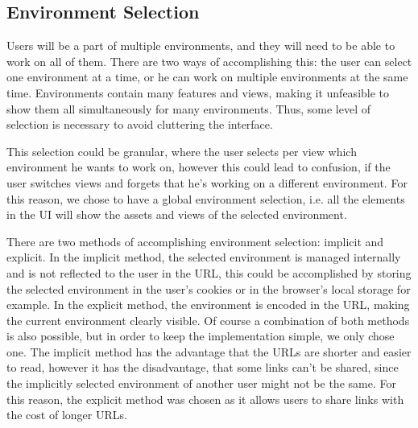 


\subsection{Environment Selection}

Users will be a part of multiple environments, and they will need to be able to work on
all of them.
There are two ways of accomplishing this: the user can select one environment at a time,
or he can work on multiple environments at the same time.
%
%
Environments contain many features and views, making it unfeasible to show them all
simultaneously for many environments.
Thus, some level of selection is necessary to avoid cluttering the interface.

%
This selection could be granular, where the user selects per view which environment he
wants to work on, however this could lead to confusion, if the user switches views and
forgets that he's working on a different environment.
For this reason, we chose to have a global environment selection, i.e. all the elements in
the UI will show the assets and views of the selected environment.

There are two methods of accomplishing environment selection: implicit and explicit.
In the implicit method, the selected environment is managed internally and is not
reflected to the user in the URL, this could be accomplished by storing the selected
environment in the user's cookies or in the browser's local storage for example.
In the explicit method, the environment is encoded in the URL,
making the current environment clearly visible.
Of course a combination of both methods is also possible, but in order to keep the
implementation simple, we only chose one.
The implicit method has the advantage that the URLs are shorter and easier to read,
however it has the disadvantage, that some links can't be shared, since the implicitly
selected environment of another user might not be the same.
For this reason, the explicit method was chosen as it allows users to share links with the
cost of longer URLs.

